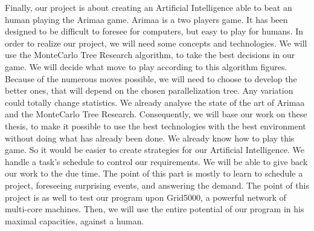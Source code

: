 
Finally, our project is about creating an Artificial Intelligence able to beat an human playing the Arimaa game.
\newline
\newline
Arimaa is a two players game. It has been designed to be difficult to foresee for computers, but easy to play for humans. 
In order to realize our project, we will need some concepts and technologies. 
We will use the MonteCarlo Tree Research algorithm, to take the best decisions in our game. We will decide what move to play according to this algorithm figures. Because of the numerous moves possible, we will need to choose to develop the better ones, that will depend on the chosen parallelization tree. Any variation could totally change statistics.
We already analyse the state of the art of Arimaa and the MonteCarlo Tree Research. Consequently, we will base our work on these thesis, to make it possible to use the best technologies with the best environment without doing what has already been done.
We already know how to play this game. So it would be easier to create strategies for our Artificial Intelligence. We handle a task's schedule to control our requirements. We will be able to give back our work to the due time. The point of this part is mostly to learn to schedule a project, foreseeing surprising events, and answering the demand.
\newline
\newline
The point of this project is as well to test our program upon Grid5000, a powerful network of multi-core machines. Then, we will use the entire potential of our program in his maximal capacities, against a human.
